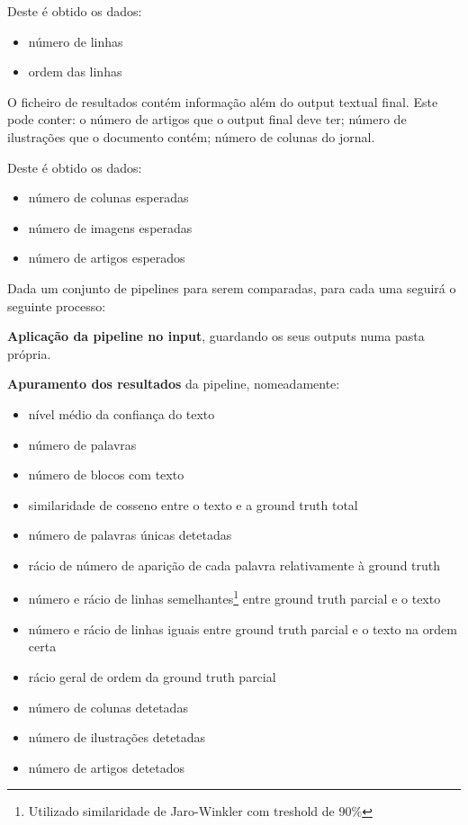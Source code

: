 Deste é obtido os dados: 

\begin{itemize}\setlength\itemsep{-0.8em}
	\item número de linhas
	\item ordem das linhas
\end{itemize}



O ficheiro de resultados contém informação além do output textual final. Este pode conter: o número de artigos que o output final deve ter; número de ilustrações que o documento contém; número de colunas do jornal.

Deste é obtido os dados: 

\begin{itemize}\setlength\itemsep{-0.8em}
	\item número de colunas esperadas
	\item número de imagens esperadas
	\item número de artigos esperados
\end{itemize}



Dada um conjunto de pipelines para serem comparadas, para cada uma seguirá o seguinte processo:

\textbf{Aplicação da pipeline no input}, guardando os seus outputs numa pasta própria.

\textbf{Apuramento dos resultados} da pipeline, nomeadamente: 

\begin{itemize}\setlength\itemsep{-0.8em}
	\item nível médio da confiança do texto
	\item número de palavras
	\item número de blocos com texto
	\item similaridade de cosseno entre o texto e a ground truth total
	\item número de palavras únicas detetadas
	\item rácio de número de aparição de cada palavra relativamente à ground truth
	\item número e rácio de linhas semelhantes\footnote{Utilizado similaridade de Jaro-Winkler com treshold de 90\%} entre ground truth parcial e o texto
	\item número e rácio de linhas iguais entre ground truth parcial e o texto na ordem certa
	\item rácio geral de ordem da ground truth parcial
	\item número de colunas detetadas
	\item número de ilustrações detetadas
	\item número de artigos detetados
\end{itemize}


